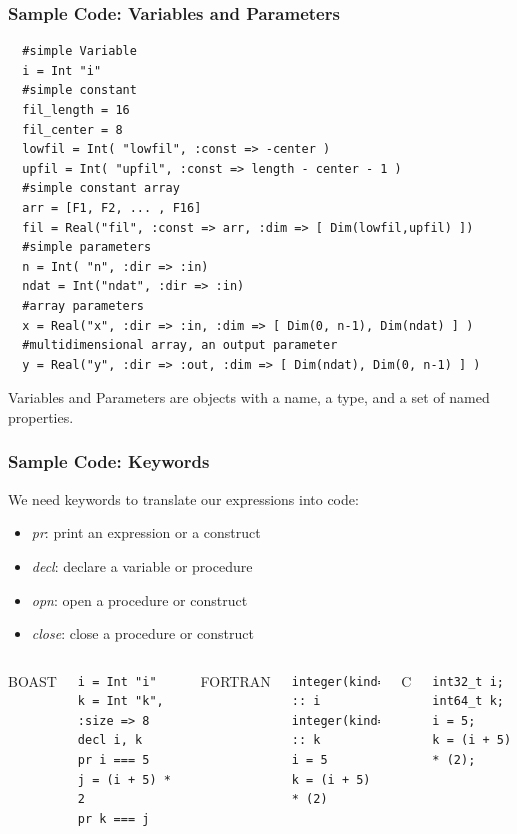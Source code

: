 \documentclass{beamer}
\begin{document}
\begin{frame}[fragile]
\frametitle{Sample Code: Variables and Parameters}
\lstset{style=BOAST}
\begin{lstlisting}
  #simple Variable
  i = Int "i"
  #simple constant
  fil_length = 16
  fil_center = 8  
  lowfil = Int( "lowfil", :const => -center )
  upfil = Int( "upfil", :const => length - center - 1 )
  #simple constant array
  arr = [F1, F2, ... , F16]
  fil = Real("fil", :const => arr, :dim => [ Dim(lowfil,upfil) ])
  #simple parameters
  n = Int( "n", :dir => :in)
  ndat = Int("ndat", :dir => :in)
  #array parameters
  x = Real("x", :dir => :in, :dim => [ Dim(0, n-1), Dim(ndat) ] )
  #multidimensional array, an output parameter
  y = Real("y", :dir => :out, :dim => [ Dim(ndat), Dim(0, n-1) ] )
\end{lstlisting}
Variables and Parameters are objects with a name, a type, and a set of named properties.
\end{frame}

\begin{frame}[fragile]
\frametitle{Sample Code: Keywords}
We need keywords to translate our expressions into code:
\begin{itemize}
\item \emph{pr}: print an expression or a construct
\item \emph{decl}: declare a variable or procedure
\item \emph{opn}: open a procedure or construct
\item \emph{close}: close a procedure or construct
\end{itemize}
\begin{columns}
BOAST
\lstset{style=BOAST}
\begin{lstlisting}
i = Int "i"
k = Int "k", :size => 8
decl i, k
pr i === 5
j = (i + 5) * 2
pr k === j
\end{lstlisting}
FORTRAN
\lstset{style=BFortran}
\begin{lstlisting}
integer(kind=4) :: i
integer(kind=8) :: k
i = 5
k = (i + 5) * (2)
\end{lstlisting}
C
\lstset{style=BC}
\begin{lstlisting}
int32_t i;
int64_t k;
i = 5;
k = (i + 5) * (2);
\end{lstlisting}
\end{columns}
\end{frame}
\end{document}
